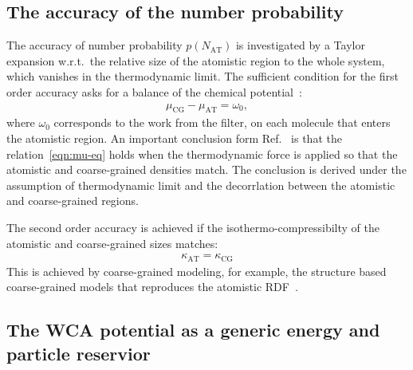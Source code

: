 \documentclass[epjST]{svjour}
\newcommand{\AT}[0]{\textrm{AT}}
\newcommand{\CG}[0]{\textrm{CG}}
\begin{document}
\subsection{The accuracy of the number probability}

The accuracy of number probability $p(N_\AT)$ is investigated by a
Taylor expansion w.r.t.~the relative size of the atomistic region to
the whole system, which vanishes in the thermodynamic limit. The sufficient condition for the first order accuracy
asks for a balance of the chemical potential~\cite{wang2013grand}:
\begin{align}\label{eqn:mu-eq}
  \mu_\CG - \mu_\AT = \omega_0,
\end{align}
where $\omega_0$ corresponds to the work from the filter, on each
molecule that enters the atomistic region. An important conclusion
form Ref.~\cite{wang2013grand} is that the relation~\eqref{eqn:mu-eq}
holds when the thermodynamic force is applied so that the atomistic
and coarse-grained densities match. The conclusion is derived under
the assumption of thermodynamic limit and the decorrlation between the
atomistic and coarse-grained regions.

The second order accuracy is achieved if the isothermo-compressibilty of the atomistic and coarse-grained sizes matches:
\begin{align}
  \kappa_\AT = \kappa_\CG
\end{align}
This is achieved by coarse-grained modeling, for example, the
structure based coarse-grained models that reproduces the atomistic
RDF~\cite{wang2009comparative}.

\subsection{The WCA potential as a generic energy and particle reservior}
\end{document}
